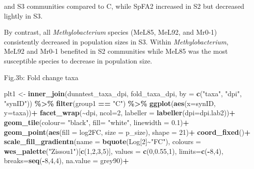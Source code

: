 \documentclass[
]{article}
\newenvironment{Shaded}{\begin{snugshade}}{\end{snugshade}}
\newcommand{\AttributeTok}[1]{\textcolor[rgb]{0.13,0.29,0.53}{#1}}
\newcommand{\DecValTok}[1]{\textcolor[rgb]{0.00,0.00,0.81}{#1}}
\newcommand{\FloatTok}[1]{\textcolor[rgb]{0.00,0.00,0.81}{#1}}
\newcommand{\FunctionTok}[1]{\textcolor[rgb]{0.13,0.29,0.53}{\textbf{#1}}}
\newcommand{\NormalTok}[1]{#1}
\newcommand{\OtherTok}[1]{\textcolor[rgb]{0.56,0.35,0.01}{#1}}
\newcommand{\SpecialCharTok}[1]{\textcolor[rgb]{0.81,0.36,0.00}{\textbf{#1}}}
\newcommand{\StringTok}[1]{\textcolor[rgb]{0.31,0.60,0.02}{#1}}
\begin{document}
and S3 communities compared to C, while SpFA2 increased in S2 but
decreased lightly in S3.

By contrast, all \emph{Methylobacterium} species (MeL85, MeL92, and
Mr0-1) consistently decreased in population sizes in S3. Within
\emph{Methylobacterium}, MeL92 and Mr0-1 benefited in S2 communities
while MeL85 was the most susceptible species to decrease in population
size.

Fig.3b: Fold change taxa

\begin{Shaded}
\begin{Highlighting}[]
\NormalTok{plt1 }\OtherTok{\textless{}{-}} \FunctionTok{inner\_join}\NormalTok{(dunntest\_taxa\_dpi, fold\_taxa\_dpi, }\AttributeTok{by =} \FunctionTok{c}\NormalTok{(}\StringTok{"taxa"}\NormalTok{, }\StringTok{"dpi"}\NormalTok{, }\StringTok{"synID"}\NormalTok{)) }\SpecialCharTok{\%\textgreater{}\%} 
    \FunctionTok{filter}\NormalTok{(group1 }\SpecialCharTok{==} \StringTok{"C"}\NormalTok{) }\SpecialCharTok{\%\textgreater{}\%} 
    \FunctionTok{ggplot}\NormalTok{(}\FunctionTok{aes}\NormalTok{(}\AttributeTok{x=}\NormalTok{synID, }\AttributeTok{y=}\NormalTok{taxa))}\SpecialCharTok{+}
    \FunctionTok{facet\_wrap}\NormalTok{(}\SpecialCharTok{\textasciitilde{}}\NormalTok{dpi, }\AttributeTok{ncol=}\DecValTok{2}\NormalTok{, }\AttributeTok{labeller =} \FunctionTok{labeller}\NormalTok{(}\AttributeTok{dpi=}\NormalTok{dpi.lab2))}\SpecialCharTok{+}
    \FunctionTok{geom\_tile}\NormalTok{(}\AttributeTok{colour=} \StringTok{"black"}\NormalTok{, }\AttributeTok{fill=} \StringTok{"white"}\NormalTok{, }\AttributeTok{linewidth =} \FloatTok{0.1}\NormalTok{)}\SpecialCharTok{+}
    \FunctionTok{geom\_point}\NormalTok{(}\FunctionTok{aes}\NormalTok{(}\AttributeTok{fill =}\NormalTok{ log2FC, }\AttributeTok{size =}\NormalTok{ p\_size), }\AttributeTok{shape =} \DecValTok{21}\NormalTok{)}\SpecialCharTok{+}
    \FunctionTok{coord\_fixed}\NormalTok{()}\SpecialCharTok{+}
    \FunctionTok{scale\_fill\_gradientn}\NormalTok{(}\AttributeTok{name =} \FunctionTok{bquote}\NormalTok{(Log[}\DecValTok{2}\NormalTok{]}\SpecialCharTok{\textasciitilde{}}\StringTok{"FC"}\NormalTok{), }\AttributeTok{colours =} \FunctionTok{wes\_palette}\NormalTok{(}\StringTok{"Zissou1"}\NormalTok{)[}\FunctionTok{c}\NormalTok{(}\DecValTok{1}\NormalTok{,}\DecValTok{2}\NormalTok{,}\DecValTok{3}\NormalTok{,}\DecValTok{5}\NormalTok{)], }
                         \AttributeTok{values =} \FunctionTok{c}\NormalTok{(}\DecValTok{0}\NormalTok{,}\FloatTok{0.55}\NormalTok{,}\DecValTok{1}\NormalTok{), }\AttributeTok{limits=}\FunctionTok{c}\NormalTok{(}\SpecialCharTok{{-}}\DecValTok{8}\NormalTok{,}\DecValTok{4}\NormalTok{), }\AttributeTok{breaks=}\FunctionTok{seq}\NormalTok{(}\SpecialCharTok{{-}}\DecValTok{8}\NormalTok{,}\DecValTok{4}\NormalTok{,}\DecValTok{4}\NormalTok{), }\AttributeTok{na.value =} \StringTok{\textquotesingle{}grey90\textquotesingle{}}\NormalTok{)}\SpecialCharTok{+}

\end{Highlighting}
\end{Shaded}
\end{document}
